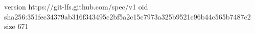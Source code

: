 version https://git-lfs.github.com/spec/v1
oid sha256:351fec34379ab316f343495c2bf5a2c15c7973a325b9521c96b44c565b7487c2
size 671

